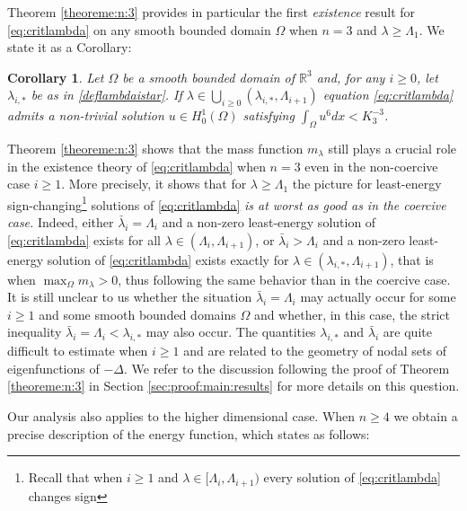 \documentclass[10pt]{amsart}
\numberwithin{equation}{section}
\newcommand{\R}{\mathbb{R}}
\newcommand{\Om}{\Omega}
\theoremstyle{plain}
\newtheorem{corol}{Corollary}[section]%
\theoremstyle{remark}
\begin{document}
Theorem \ref{theoreme:n:3} provides in particular the first \emph{existence} result for \eqref{eq:critlambda} on any smooth bounded domain $\Om$ when $n = 3$ and $\lambda \ge \Lambda_1$. We state it as a Corollary: 

\begin{corol} \label{corol:n:3}
Let $\Omega$ be a smooth bounded domain of $\R^3$ and, for any $i \ge 0$, let $\lambda_{i,*}$ be as in \eqref{deflambdaistar}. If $ \lambda \in \bigcup_{i \ge 0} (\lambda_{i,*}, \Lambda_{i+1})$ equation \eqref{eq:critlambda} admits a non-trivial solution $u \in H^1_0(\Om)$ satisfying $\int_{\Om} u^6 dx < K_3^{-3}$. 
\end{corol}

Theorem \ref{theoreme:n:3} shows that the mass function $m_\lambda$ still plays a crucial role in the existence theory of \eqref{eq:critlambda} when $n=3$ even in the non-coercive case $i \ge 1$. More precisely, it shows that for $\lambda \ge \Lambda_1$ the picture for least-energy sign-changing\footnote{Recall that when $i \ge 1$ and $\lambda \in [\Lambda_i, \Lambda_{i+1})$  every solution of \eqref{eq:critlambda} changes sign} solutions of \eqref{eq:critlambda} \emph{is at worst as good as in the coercive case.} Indeed, either $\bar{\lambda}_i = \Lambda_i$ and a non-zero least-energy solution of \eqref{eq:critlambda} exists for all $\lambda \in (\Lambda_i, \Lambda_{i+1})$, or $\bar{\lambda}_i > \Lambda_i$ and a non-zero least-energy solution of \eqref{eq:critlambda} exists exactly for  $\lambda \in (\lambda_{i,*}, \Lambda_{i+1})$,  that is when  $\max_\Om m_\lambda >0$, thus following the same behavior than in the coercive case. It is still unclear to us whether the situation $\bar{\lambda}_{i} = \Lambda_i$ may actually occur for some $i \ge 1$ and some smooth bounded domains $\Om$ and whether, in this case, the strict inequality $\bar{\lambda}_i = \Lambda_i <  \lambda_{i,*}$ may also occur. The quantities $\lambda_{i,*}$ and $\bar{\lambda}_i$ are quite difficult to estimate when $i \ge 1$ and are related to the geometry of nodal sets of eigenfunctions of $-\Delta$. We refer to the discussion following the proof of Theorem \ref{theoreme:n:3} in Section \ref{sec:proof:main:results} for more details on this question.  

\medskip

Our analysis also applies to the higher dimensional case. When $n \ge 4$ we obtain a precise description of the energy function, which states as follows: 
 
\end{document}
